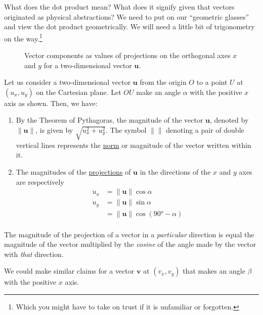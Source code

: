 \documentclass[
  a4paper,
]{article}
\begin{document}
What does the dot product mean? What does it signify given that vectors
originated as physical abstractions? We need to put on our ``geometric
glasses'' and view the dot product geometrically. We will need a little
bit of trigonometry on the way.\footnote{Which you might have to take on
  trust if it is unfamiliar or forgotten.}

\begin{figure}
\hypertarget{fig:projection}{%
\centering

\caption{Vector components as values of projections on the orthogonal
axes \(x\) and \(y\) for a two-dimensional vector
\(\symbf{u}\).}\label{fig:projection}
}
\end{figure}

Let us consider a two-dimensional vector \(\symbf{u}\) from the origin
\(O\) to a point \(U\) at \((u_{x}, u_{y})\) on the Cartesian plane. Let
\(OU\) make an angle \(\alpha\) with the positive \(x\) axis as shown.
Then, we have:

\begin{enumerate}
\def\labelenumi{\arabic{enumi}.}
\item
  By the Theorem of Pythagoras, the magnitude of the vector
  \(\symbf{u}\), denoted by \(\lVert\symbf{u}\rVert\), is given by
  \(\sqrt{u_{x}^2 + u_{y}^2}\). The symbol \(\lVert\mbox{}\rVert\)
  denoting a pair of double vertical lines represents the
  \href{https://mathworld.wolfram.com/Norm.html}{norm} or magnitude of
  the vector written within it.
\item
  The magnitudes of the
  \href{https://en.wikipedia.org/wiki/Vector_projection}{projections} of
  \(\symbf{u}\) in the directions of the \(x\) and \(y\) axes are
  respectively \[
  \begin{aligned}
  u_{x} &= \lVert\symbf{u}\rVert\cos\alpha\\
  u_{y} &= \lVert\symbf{u}\rVert\sin\alpha\\
  &= \lVert\symbf{u}\rVert\cos(90°-\alpha)\\
  \end{aligned}
  \]
\end{enumerate}

The magnitude of the projection of a vector in a \emph{particular}
direction is equal the magnitude of the vector multiplied by the
\emph{cosine} of the angle made by the vector with \emph{that}
direction.

We could make similar claims for a vector \(\symbf{v}\) at
\((v_{x}, v_{y})\) that makes an angle \(\beta\) with the positive \(x\)
axis.
\end{document}
